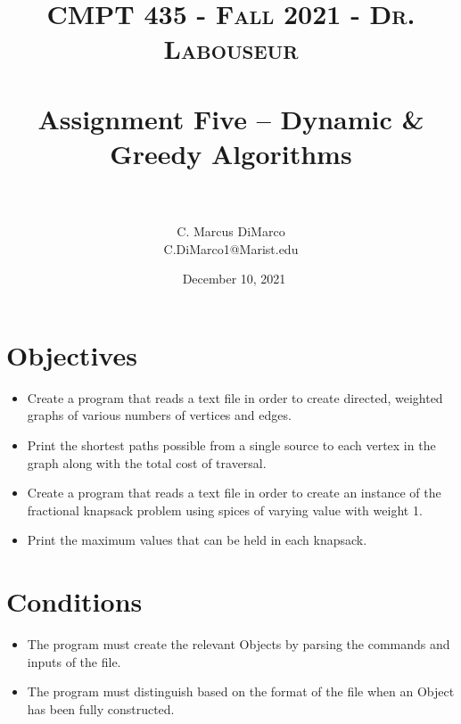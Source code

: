 \documentclass[letterpaper, 10pt]{article}
\title{	
   \normalfont \normalsize 
   \textsc{CMPT 435 - Fall 2021 - Dr. Labouseur} \\[10pt] %
   \horrule{0.5pt} \\[0.25cm] 	%
   \huge Assignment Five -- Dynamic \& Greedy Algorithms \\     	    %
   \horrule{0.5pt} \\[0.25cm] 	%
}
\author{C. Marcus DiMarco \\ \normalsize C.DiMarco1@Marist.edu}
\date{\normalsize\ December 10, 2021} 	%
\begin{document}
\maketitle %



\section{Objectives}

\begin{itemize}
    \item \hspace{0.5em}Create a program that reads a text file in order to create directed, weighted graphs of various numbers of vertices and edges.
    \item \hspace{0.5em}Print the shortest paths possible from a single source to each vertex in the graph along with the total cost of traversal.
    \item \hspace{0.5em}Create a program that reads a text file in order to create an instance of the fractional knapsack problem using spices of varying value with weight 1.
    \item \hspace{0.5em}Print the maximum values that can be held in each knapsack.
\end{itemize}

\vspace{1.0em}

\section{Conditions}

\begin{itemize}
    \item \hspace{0.5em}The program must create the relevant Objects by parsing the commands and inputs of the file.
    \item \hspace{0.5em}The program must distinguish based on the format of the file when an Object has been fully constructed.
\end{itemize}
\end{document}
